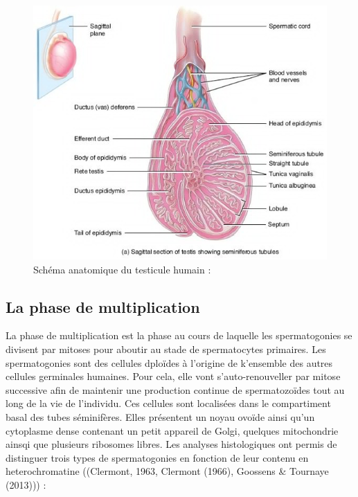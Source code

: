 \documentclass[12pt,twoside]{reedthesis}
\theoremstyle{definition}
\theoremstyle{definition}
\theoremstyle{remark}
\begin{document}
  \begin{figure}
  
  {\centering \includegraphics[scale=0.65]{figure/coupe_testicule2} 
  
  }
  
  \caption{Schéma anatomique du testicule humain : }\label{fig:testicule}
  \end{figure}
  
  \subsection{La phase de
  multiplication}\label{la-phase-de-multiplication}
  
  La phase de multiplication est la phase au cours de laquelle les
  spermatogonies se divisent par mitoses pour aboutir au stade de
  spermatocytes primaires. Les spermatogonies sont des cellules dploïdes à
  l'origine de k'ensemble des autres cellules germinales humaines. Pour
  cela, elle vont s'auto-renouveller par mitose successive afin de
  maintenir une production continue de spermatozoïdes tout au long de la
  vie de l'individu. Ces cellules sont localisées dans le compartiment
  basal des tubes séminifères. Elles présentent un noyau ovoïde ainsi
  qu'un cytoplasme dense contenant un petit appareil de Golgi, quelques
  mitochondrie ainsqi que plusieurs ribosomes libres. Les analyses
  histologiques ont permis de distinguer trois types de spermatogonies en
  fonction de leur contenu en heterochromatine ((Clermont, 1963, Clermont
  (1966), Goossens \& Tournaye (2013))) :
  
\end{document}
